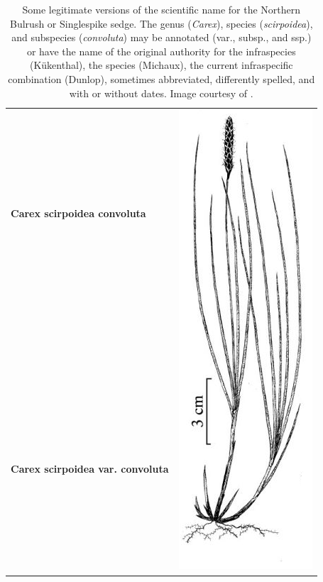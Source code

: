 \documentclass{bmcart}
\begin{document}
\begin{table}[!htb]
  \begin{center}

  \caption{Some legitimate versions of the scientific name for the Northern
    Bulrush or Singlespike sedge.  The genus (\textit{Carex}), species
    (\textit{scirpoidea}), and subspecies (\textit{convoluta}) may be annotated
    (var., subsp., and ssp.) or have the name of the original authority for the
    infraspecies (Kükenthal), the species (Michaux), the current infraspecific
    combination (Dunlop), sometimes abbreviated, differently spelled, and with or without dates.
    Image courtesy of \cite{FNA2002}.}\label{table:carex}

    \begin{tabular}{| l | c |}
    \hline
    \textbf{Carex scirpoidea convoluta} &
    \multirow{26}{*}{\includegraphics[scale=0.3]{images/carex.png}} \\
    & \\
    \textbf{Carex scirpoidea var. convoluta} & \\

\end{tabular}
\end{center}
\end{table}
\end{document}

